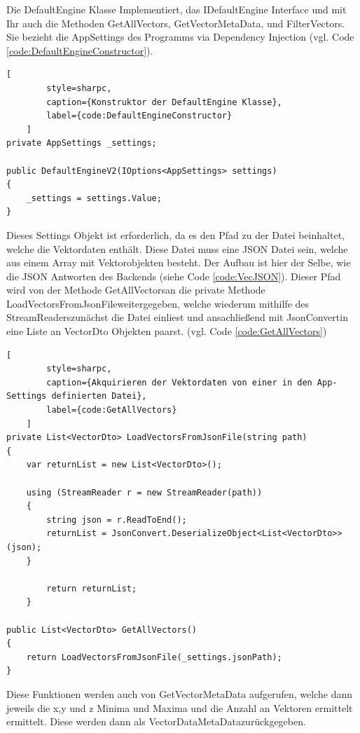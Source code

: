 Die DefaultEngine Klasse Implementiert, das IDefaultEngine Interface
und mit Ihr auch die Methoden GetAllVectors, GetVectorMetaData,
und FilterVectors. Sie bezieht die AppSettings des Programms via
Dependency Injection (vgl. Code \ref{code:DefaultEngineConstructor}).

\begin{codeblock}
	\begin{lstlisting}[
		style=sharpc,
		caption={Konstruktor der DefaultEngine Klasse},
		label={code:DefaultEngineConstructor}
	]
private AppSettings _settings;

public DefaultEngineV2(IOptions<AppSettings> settings)
{
	_settings = settings.Value;
}
	\end{lstlisting}
\end{codeblock}

Dieses Settings Objekt ist erforderlich, da es den Pfad zu der Datei
beinhaltet, welche die Vektordaten enthält. Diese Datei muss eine JSON
Datei sein, welche aus einem Array mit Vektorobjekten besteht.
Der Aufbau ist hier der Selbe, wie die JSON Antworten des Backends
(siehe Code \ref{code:VecJSON}). Dieser Pfad wird von der Methode
\grqq GetAllVectors\grqq\space an die private Methode
\grqq LoadVectorsFromJsonFile\grqq\space weitergegeben, welche wiederum
mithilfe des \grqq StreamReaders\grqq\space zunächst die Datei einliest
und ansachließend mit \grqq JsonConvert\grqq\space in eine Liste an
VectorDto Objekten paarst. (vgl. Code \ref{code:GetAllVectors})

\begin{codeblock}
	\begin{lstlisting}[
		style=sharpc,
		caption={Akquirieren der Vektordaten von einer in den App-Settings definierten Datei},
		label={code:GetAllVectors}
	]
private List<VectorDto> LoadVectorsFromJsonFile(string path)
{
	var returnList = new List<VectorDto>();

	using (StreamReader r = new StreamReader(path))
	{
		string json = r.ReadToEnd();
		returnList = JsonConvert.DeserializeObject<List<VectorDto>>(json);
	}

		return returnList;
	}

public List<VectorDto> GetAllVectors()
{
	return LoadVectorsFromJsonFile(_settings.jsonPath);
}
	\end{lstlisting}
\end{codeblock}

Diese Funktionen werden auch von \grqq GetVectorMetaData\grqq\space
aufgerufen, welche dann jeweils die x,y und z Minima und Maxima und
die Anzahl an Vektoren ermittelt ermittelt. Diese werden dann als
\grqq VectorDataMetaData\grqq\space zurückgegeben.

